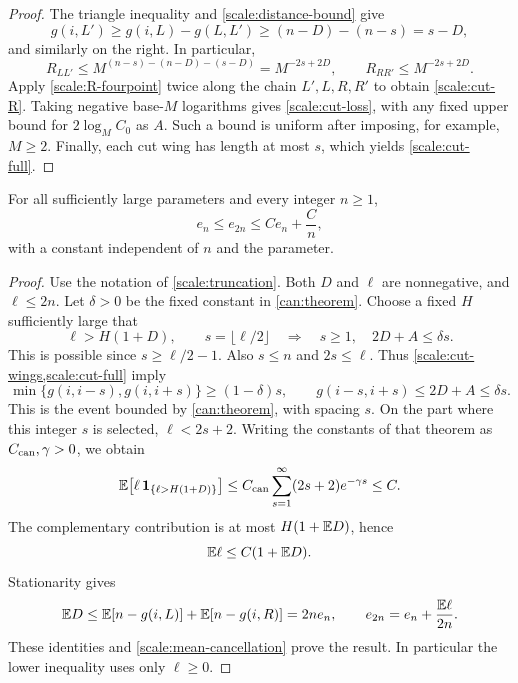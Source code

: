 \begin{proof}
The triangle inequality and \cref{scale:distance-bound} give
\[
 g(i,L')\ge g(i,L)-g(L,L')\ge(n-D)-(n-s)=s-D,
\]
and similarly on the right. In particular,
\[
 R_{LL'}\le M^{(n-s)-(n-D)-(s-D)}=M^{-2s+2D},
 \qquad R_{RR'}\le M^{-2s+2D}.
\]
Apply \cref{scale:R-fourpoint} twice along the chain $L',L,R,R'$ to
obtain \cref{scale:cut-R}. Taking negative base-$M$ logarithms gives
\cref{scale:cut-loss}, with any fixed upper bound for
$2\log_M C_0$ as $A$. Such a bound is uniform after imposing, for
example, $M\ge2$. Finally, each cut wing has length at most $s$,
which yields \cref{scale:cut-full}.
\end{proof}

\begin{lemma}\label{scale:doubling}
For all sufficiently large parameters and every integer $n\ge1$,
\begin{equation}\label{scale:doubling-equation}
 e_n\le e_{2n}\le C e_n+\frac{C}{n},
\end{equation}
with a constant independent of $n$ and the parameter.
\end{lemma}

\begin{proof}
Use the notation of \cref{scale:truncation}. Both $D$ and $\ell$ are
nonnegative, and $\ell\le2n$. Let $\delta>0$ be the fixed constant
in \cref{can:theorem}. Choose a fixed $H$ sufficiently large that
\[
 \ell>H(1+D),\qquad s=\lfloor\ell/2\rfloor
 \quad\Longrightarrow\quad
 s\ge1,\quad 2D+A\le\delta s.
\]
This is possible since $s\ge\ell/2-1$. Also $s\le n$ and
$2s\le\ell$. Thus \cref{scale:cut-wings,scale:cut-full} imply
\[
 \min\{g(i,i-s),g(i,i+s)\}\ge(1-\delta)s,
 \qquad g(i-s,i+s)\le2D+A\le\delta s.
\]
This is the event bounded by \cref{can:theorem}, with spacing $s$.
On the part where this integer $s$ is selected, $\ell<2s+2$.
Writing the constants of that theorem as $C_{\rm can},\gamma>0$,
we obtain
\[
 \mathbb{E}\bigl[\ell\,\mathbf{1}_{\{\ell>H(1+D)\}}\bigr]
 \le C_{\rm can}\sum_{s=1}^{\infty}(2s+2)e^{-\gamma s}
 \le C.
\]
The complementary contribution is at most $H(1+\mathbb{E} D)$, hence
\begin{equation}\label{scale:mean-cancellation}
 \mathbb{E}\ell\le C(1+\mathbb{E} D).
\end{equation}
Stationarity gives
\[
 \mathbb{E} D\le\mathbb{E}[n-g(i,L)]+\mathbb{E}[n-g(i,R)]=2ne_n,
 \qquad e_{2n}=e_n+\frac{\mathbb{E}\ell}{2n}.
\]
These identities and \cref{scale:mean-cancellation} prove the result.
In particular the lower inequality uses only $\ell\ge0$.
\end{proof}

